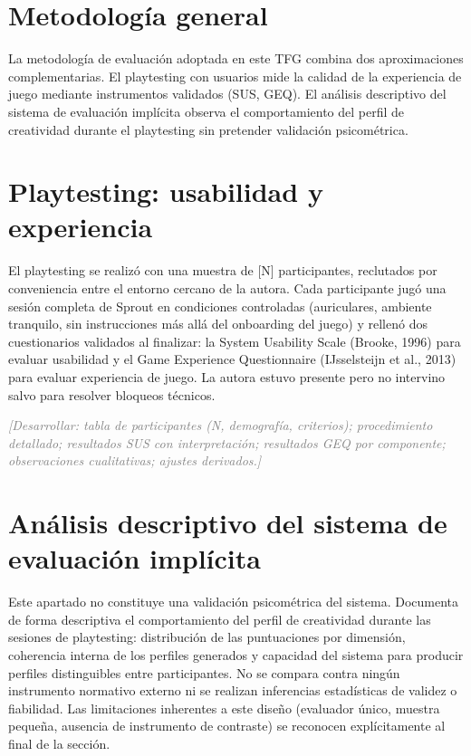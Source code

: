 \documentclass[12pt,twoside,titlepage]{report}
\begin{document}
\section{Metodología general}

La metodología de evaluación adoptada en este TFG combina dos aproximaciones complementarias. El playtesting con usuarios mide la calidad de la experiencia de juego mediante instrumentos validados (SUS, GEQ). El análisis descriptivo del sistema de evaluación implícita observa el comportamiento del perfil de creatividad durante el playtesting sin pretender validación psicométrica.

\section{Playtesting: usabilidad y experiencia}

El playtesting se realizó con una muestra de [N] participantes, reclutados por conveniencia entre el entorno cercano de la autora. Cada participante jugó una sesión completa de Sprout en condiciones controladas (auriculares, ambiente tranquilo, sin instrucciones más allá del onboarding del juego) y rellenó dos cuestionarios validados al finalizar: la System Usability Scale (Brooke, 1996) para evaluar usabilidad y el Game Experience Questionnaire (IJsselsteijn et al., 2013) para evaluar experiencia de juego. La autora estuvo presente pero no intervino salvo para resolver bloqueos técnicos.

\textcolor{gray}{\textit{[Desarrollar: tabla de participantes (N, demografía, criterios); procedimiento detallado; resultados SUS con interpretación; resultados GEQ por componente; observaciones cualitativas; ajustes derivados.]}}

\section{Análisis descriptivo del sistema de evaluación implícita}

Este apartado no constituye una validación psicométrica del sistema. Documenta de forma descriptiva el comportamiento del perfil de creatividad durante las sesiones de playtesting: distribución de las puntuaciones por dimensión, coherencia interna de los perfiles generados y capacidad del sistema para producir perfiles distinguibles entre participantes. No se compara contra ningún instrumento normativo externo ni se realizan inferencias estadísticas de validez o fiabilidad. Las limitaciones inherentes a este diseño (evaluador único, muestra pequeña, ausencia de instrumento de contraste) se reconocen explícitamente al final de la sección.
\end{document}
